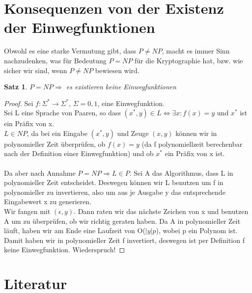 \documentclass[12pt,a4paper]{article}
\newtheorem{theorem}{Satz}[section]
\theoremstyle{definition}
\begin{document}
    \section{Konsequenzen von der Existenz der Einwegfunktionen}

    Obwohl es eine starke Vermutung gibt, dass $P \not = NP$, macht es immer Sinn nachzudenken, was für Bedeutung
    $P = NP$ für die Kryptographie hat, bzw. wie sicher wir sind, wenn $P \not = NP$ bewiesen wird.

    \begin{theorem}
        $P = NP \Rightarrow$ es existieren keine Einwegfunktionen
    \end{theorem}

    \begin{proof}
        Sei $f: \Sigma^* \longrightarrow \Sigma^*$, $\Sigma = {0, 1}$, eine Einwegfunktion. \\
        Sei L eine Sprache von Paaren, so dass $(x^*, y) \in L \Leftrightarrow \exists x: f(x) = y$ und $x^*$ ist ein
        Präfix von x. \\
        $L \in NP$, da bei ein Eingabe $(x^*, y)$ und Zeuge $(x, y)$ können wir in polynomieller Zeit überprüfen,
        ob $f(x) = y$ (da f polynomiellzeit berechenbar nach der Definition einer Einwegfunktion) und ob $x^*$ ein
        Präfix von x ist. \\ \\

        Da aber nach Annahme $P = NP \Rightarrow L \in P$. Sei A das Algorithmus, dass L in polynomieller Zeit
        entscheidet. Deswegen können wir L benutzen um f in polynomieller
        zu invertieren, also um aus je Ausgabe y das entsprechende Eingabewert x zu generieren. \\
        Wir fangen mit $(\epsilon, y)$. Dann raten wir das nächste Zeichen von x und benutzen A um zu überprüfen,
        ob wir richtig geraten haben. Da A in polynomieller Zeit läuft, haben wir am Ende eine Laufzeit von O($|y|p$),
        wobei p ein Polynom ist. Damit haben wir in polynomieller Zeit f invertiert, deswegen ist per Definition
        f keine Einwegfunktion. Wiederspruch!
    \end{proof}

    \section{Literatur}
\end{document}
